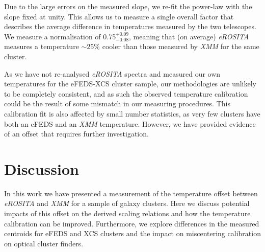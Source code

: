 \documentclass[fleqn,usenatbib]{mnras}
\begin{document}
Due to the large errors on the measured slope, we re-fit the power-law with the slope fixed at unity.  This allows us to measure a single overall factor that describes the average difference in temperatures measured by the two telescopes.  We measure a normalisation of 0.75$^{+0.09}_{-0.08}$, meaning that (on average) {\em eROSITA} measures a temperature ${\sim}25\%$ cooler than those measured by {\em XMM} for the same cluster.

As we have not re-analysed {\em eROSITA} spectra and measured our own temperatures for the eFEDS-XCS cluster sample, our methodologies are unlikely to be completely consistent, and as such the observed temperature calibration could be the result of some mismatch in our measuring procedures. This calibration fit is also affected by small number statistics, as very few clusters have both an eFEDS and an {\em XMM} temperature. However, we have provided evidence of an offset that requires further investigation.


\section{Discussion}
\label{sec:discussion}
In this work we have presented a measurement of the temperature offset between {\em eROSITA} and {\em XMM} for a sample of galaxy clusters.  Here we discuss potential impacts of this offset on the derived scaling relations and how the temperature calibration can be improved.  Furthermore, we explore differences in the measured centroids for eFEDS and XCS clusters and the impact on miscentering calibration on optical cluster finders.
\end{document}
